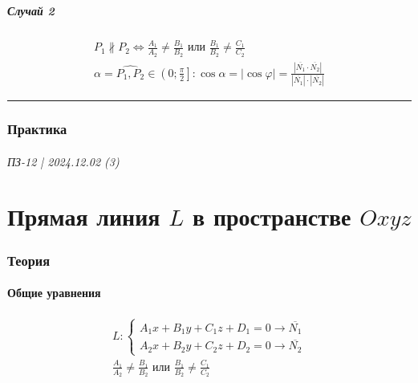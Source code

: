 \documentclass{article}
\begin{document}
\subsubsection{Случай 2}
\begin{gather*}
    \boxed{P_1 \nparallel P_2} \Leftrightarrow 
    \frac{A_1}{A_2} \neq \frac{B_1}{B_2} \text{ или } \frac{B_1}{B_2} \neq \frac{C_1}{C_2} \\
    \alpha = \widehat{P_1, P_2} \in \left( 0; \frac{\pi}{2} \right]:
    \cos \alpha = |\cos \varphi| = \frac{| \overline{N_1} \cdot \overline{N_2} |}{| \overline{N_1} | \cdot | \overline{N_2} |}
\end{gather*}



\par\noindent\rule{\textwidth}{2pt}
\section{Практика}

\subsection{}


\newpage
\paragraph{ПЗ-12 | 2024.12.02 (3)}
\part{Прямая линия $L$ в пространстве $Oxyz$}

\section{Теория}

\subsection{Общие уравнения}
\begin{gather*}
    L:
    \begin{cases}
        A_1x + B_1y + C_1z + D_1 = 0 \rightarrow \overline{N_1} \\
        A_2x + B_2y + C_2z + D_2 = 0 \rightarrow \overline{N_2}
    \end{cases} \\
    \frac{A_1}{A_2} \neq \frac{B_1}{B_2} \text{ или } \frac{B_1}{B_2} \neq \frac{C_1}{C_2} \\
\end{gather*}
\end{document}
